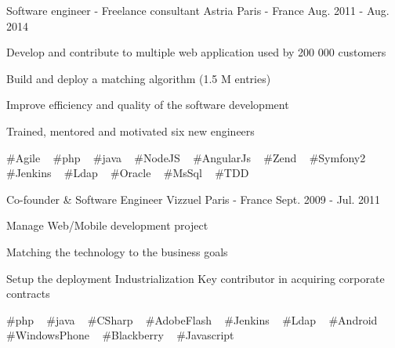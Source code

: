 \begin{cventries}
  \cventry
    {Software engineer - Freelance consultant} %
    {Astria} %
    {Paris - France} %
    {Aug. 2011 - Aug. 2014} %
    {
      \begin{cvitems} %
        \item {Develop and contribute to multiple web application used by 200 000 customers}
        \item {Build and deploy a matching algorithm (1.5 M entries)}
        \item {Improve efficiency and quality of the software development}
        \item {Trained, mentored and motivated six new engineers}
      \end{cvitems}
    }
    {
      \#Agile ~
      \#php ~
      \#java ~
      \#NodeJS ~
      \#AngularJs ~
      \#Zend ~
      \#Symfony2 ~
      \#Jenkins ~
      \#Ldap ~
      \#Oracle ~
      \#MsSql ~
      \#TDD
    }

  \cventry
    {Co-founder \& Software Engineer} %
    {Vizzuel} %
    {Paris - France} %
    {Sept. 2009 - Jul. 2011} %
    {
      \begin{cvitems} %
        \item {Manage Web/Mobile development project}
        \item {Matching the technology to the business goals}
        \item {Setup the deployment Industrialization Key contributor in acquiring corporate contracts}
      \end{cvitems}
    }
    {
      \#php ~
      \#java ~
      \#CSharp ~
      \#AdobeFlash ~
      \#Jenkins ~
      \#Ldap ~
      \#Android ~
      \#WindowsPhone ~
      \#Blackberry ~
      \#Javascript
    }

\end{cventries}
